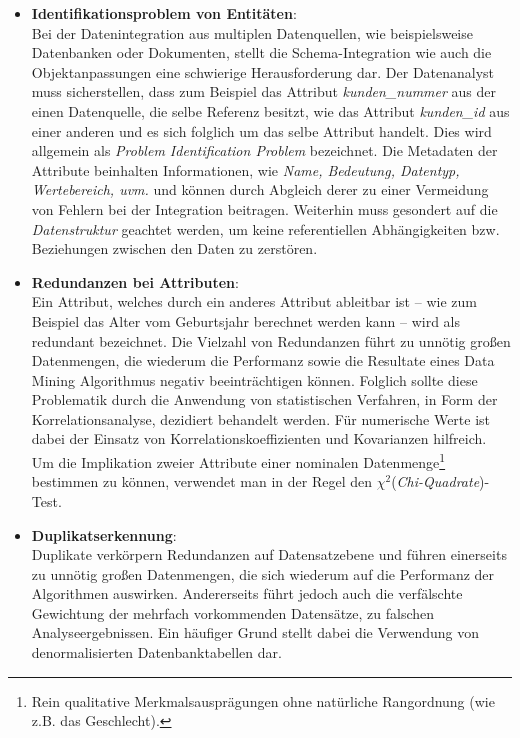 \begin{itemize}
\item \textbf{Identifikationsproblem von Entitäten}:
\\ Bei der Datenintegration aus multiplen Datenquellen, wie beispielsweise Datenbanken oder Dokumenten, stellt die Schema-Integration wie auch die Objektanpassungen eine schwierige Herausforderung dar. Der Datenanalyst muss sicherstellen, dass zum Beispiel das Attribut \textit{kunden\_nummer} aus der einen Datenquelle, die selbe Referenz besitzt, wie das Attribut \textit{kunden\_id} aus einer anderen und es sich folglich um das selbe Attribut handelt. Dies wird allgemein als \textit{Problem Identification Problem} bezeichnet. Die Metadaten der Attribute beinhalten Informationen, wie \textit{Name, Bedeutung, Datentyp, Wertebereich, uvm.} und können durch Abgleich derer zu einer Vermeidung von Fehlern bei der Integration beitragen. Weiterhin muss gesondert auf die \textit{Datenstruktur} geachtet werden, um keine referentiellen Abhängigkeiten bzw. Beziehungen zwischen den Daten zu zerstören. 

\item \textbf{Redundanzen bei Attributen}:
\\ Ein Attribut, welches durch ein anderes Attribut ableitbar ist -- wie zum Beispiel das Alter vom Geburtsjahr berechnet werden kann -- wird als redundant bezeichnet. Die Vielzahl von Redundanzen führt zu unnötig großen Datenmengen, die wiederum die Performanz sowie die Resultate eines Data Mining Algorithmus negativ beeinträchtigen können. Folglich sollte diese Problematik durch die Anwendung von statistischen Verfahren, in Form der Korrelationsanalyse, dezidiert behandelt werden. Für numerische Werte ist dabei der Einsatz von Korrelationskoeffizienten und Kovarianzen hilfreich.\enlargethispage{2\baselineskip} Um die Implikation zweier Attribute einer nominalen Datenmenge\footnote{Rein qualitative Merkmalsausprägungen ohne natürliche Rangordnung (wie z.B. das Geschlecht).} bestimmen zu können, verwendet man in der Regel den $\chi^2$(\textit{Chi-Quadrate})-Test. 

\item \textbf{Duplikatserkennung}:
\\ Duplikate verkörpern Redundanzen auf Datensatzebene und führen einerseits zu unnötig großen Datenmengen, die sich wiederum auf die Performanz der Algorithmen auswirken. Andererseits führt jedoch auch die verfälschte Gewichtung der mehrfach vorkommenden Datensätze, zu falschen Analyseergebnissen. Ein häufiger Grund stellt dabei die Verwendung von denormalisierten Datenbanktabellen dar.


\end{itemize}
